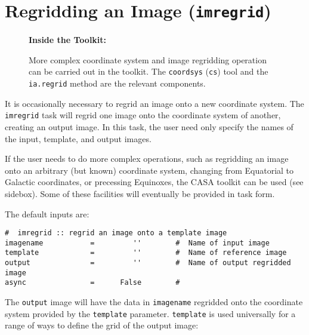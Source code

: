 \section{Regridding an Image ({\tt imregrid})}
\label{section:analysis.regrid}

\begin{wrapfigure}{r}{2.5in}
  \begin{boxedminipage}{2.5in}
     \centerline{\bf Inside the Toolkit:}
     More complex coordinate system and image regridding 
     operation can be carried out in the toolkit.  The 
     {\tt coordsys} ({\tt cs}) tool and the {\tt ia.regrid}
     method are the relevant components.
  \end{boxedminipage}
\end{wrapfigure}

It is occasionally necessary to regrid an image onto a new coordinate
system.  The {\tt imregrid} task will regrid one image onto the
coordinate system of another, creating an output image.  In this
task, the user need only specify the names of the input, template, and
output images.  

If the user needs to do more complex operations, such as regridding an
image onto an arbitrary (but known) coordinate system, changing from
Equatorial to Galactic coordinates, or precessing Equinoxes, the CASA
toolkit can be used (see sidebox).  Some of these facilities will
eventually be provided in task form.

The default inputs are:
\small
\begin{verbatim}
#  imregrid :: regrid an image onto a template image
imagename           =         ''        #  Name of input image
template            =         ''        #  Name of reference image
output              =         ''        #  Name of output regridded image
async               =      False        #  
\end{verbatim}
\normalsize
The {\tt output} image will have the data in {\tt imagename} regridded
onto the coordinate system provided by the {\tt template} parameter.
{\tt template} is used universally for a range of ways to define the
grid of the output image:

